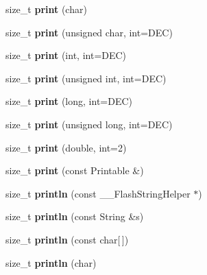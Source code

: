 \begin{DoxyCompactItemize}
size\+\_\+t {\bfseries print} (char)
\item 
\mbox{\label{class_print_a97bd44df9222fa4a51a1266fab8d3bc1}} 
size\+\_\+t {\bfseries print} (unsigned char, int=D\+EC)
\item 
\mbox{\label{class_print_a32cb3cf32d701c797b2b2d1080052dfe}} 
size\+\_\+t {\bfseries print} (int, int=D\+EC)
\item 
\mbox{\label{class_print_a87275de35583868a370f43ce1c887750}} 
size\+\_\+t {\bfseries print} (unsigned int, int=D\+EC)
\item 
\mbox{\label{class_print_ab1fb2a2384c7b9f628943f5046e7d1c1}} 
size\+\_\+t {\bfseries print} (long, int=D\+EC)
\item 
\mbox{\label{class_print_a26a40be7a557c0bc391a15dce9f06954}} 
size\+\_\+t {\bfseries print} (unsigned long, int=D\+EC)
\item 
\mbox{\label{class_print_ae8b4c025786c820afe0a90aeea01c9c5}} 
size\+\_\+t {\bfseries print} (double, int=2)
\item 
\mbox{\label{class_print_a901b0f06ae34aab31b8fbb4298f0596e}} 
size\+\_\+t {\bfseries print} (const Printable \&)
\item 
\mbox{\label{class_print_a4fd286b325d3b1a786cfa35072a8ef52}} 
size\+\_\+t {\bfseries println} (const \+\_\+\+\_\+\+Flash\+String\+Helper $\ast$)
\item 
\mbox{\label{class_print_afd6cc6e2c1163f94c60855ad233899bd}} 
size\+\_\+t {\bfseries println} (const String \&s)
\item 
\mbox{\label{class_print_ad337ce3f7977411b7d34d47a51e5737e}} 
size\+\_\+t {\bfseries println} (const char\mbox{[}$\,$\mbox{]})
\item 
\mbox{\label{class_print_a554896a71162f967b5794401239d7a01}} 
size\+\_\+t {\bfseries println} (char)
\item 
\mbox{\label{class_print_ac9afe80f50f0118d735295aec7727e50}} 

\end{DoxyCompactItemize}
